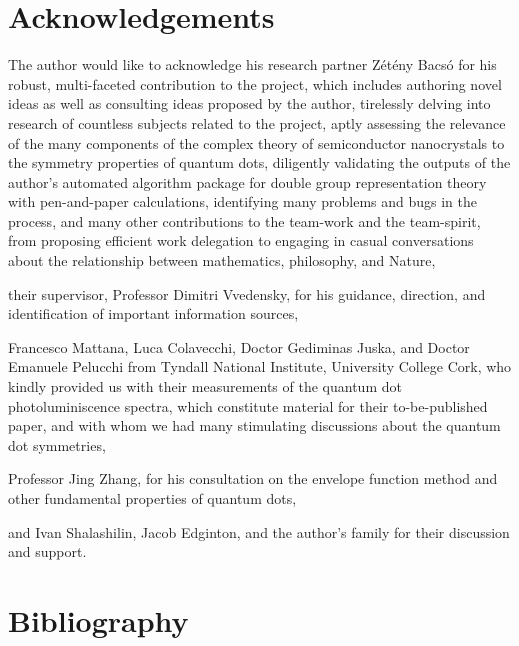 \documentclass[12pt]{article}
\begin{document}
\section{Acknowledgements}
The author would like to acknowledge his research partner Zétény Bacsó for his robust, multi-faceted contribution to the project, which includes authoring novel ideas as well as consulting ideas proposed by the author, tirelessly delving into research of countless subjects related to the project, aptly assessing the relevance of the many components of the complex theory of semiconductor nanocrystals to the symmetry properties of quantum dots, diligently validating the outputs of the author's automated algorithm package for double group representation theory with pen-and-paper calculations, identifying many problems and bugs in the process, and many other contributions to the team-work and the team-spirit, from proposing efficient work delegation to engaging in casual conversations about the relationship between mathematics, philosophy, and Nature,

their supervisor, Professor Dimitri Vvedensky, for his guidance, direction, and identification of important information sources,

Francesco Mattana, Luca Colavecchi, Doctor Gediminas Juska, and Doctor Emanuele Pelucchi from Tyndall National Institute, University College Cork, who kindly provided us with their measurements of the quantum dot photoluminiscence spectra, which constitute material for their to-be-published paper, and with whom we had many stimulating discussions about the quantum dot symmetries,

Professor Jing Zhang, for his consultation on the envelope function method and other fundamental properties of quantum dots,

and Ivan Shalashilin, Jacob Edginton, and the author's family for their discussion and support.

\pagebreak

\section{Bibliography}
\end{document}
